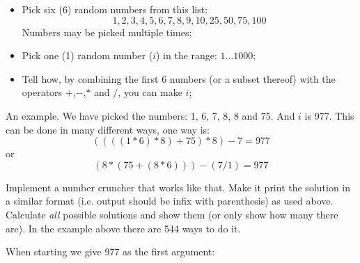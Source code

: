 \begin{Exercise}[title={Number cruncher},difficulty=9]
\label{ex:numbercruncher}
\begin{itemize}
\item{Pick six (6) random numbers from this list:
$$1, 2, 3, 4, 5, 6, 7, 8, 9, 10, 25, 50, 75, 100$$
Numbers may be picked multiple times;}
\item{Pick one (1) random number ($i$) in the range: $1 \ldots 1000$;}
\item{Tell how, by combining the first 6 numbers (or a subset thereof)
with the operators $+$,$-$,$*$ and $/$, you can make $i$;}
\end{itemize}
An example. We have picked the numbers: 1, 6, 7, 8, 8 and 75. And $i$ is
977. This can be done in many different ways, one way is:
$$ ((((1 * 6) * 8) + 75) * 8) - 7 = 977$$ 
or
$$ (8*(75+(8*6)))-(7/1) = 977$$

\Question\label{ex:cruncher q1}
Implement a number cruncher that works like that. Make it print the
solution in a similar format (i.e. output should be infix with
parenthesis) as used above.
\Question\label{ex:cruncher q2}
Calculate \emph{all} possible solutions and show them (or only show how
many there are). In the example above there are 544 ways to do it.
\end{Exercise}

\begin{Answer}
\Question 


\Question
When starting  we give 977 as the first argument:
\vspace{1em}

\end{Answer}
